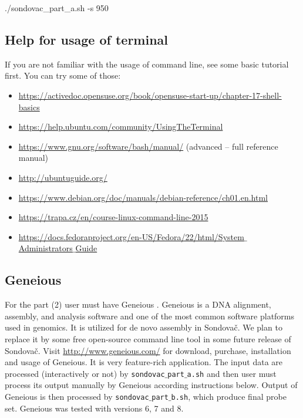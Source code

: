 \documentclass[a4paper, 11pt, twoside]{article}
\begin{document}
\begin{bashcode}
  ./sondovac_part_a.sh -s 950
\end{bashcode}

\subsection{Help for usage of terminal}

If you are not familiar with the usage of command line, see some basic tutorial first. You can try some of those:

\begin{itemize}
\item \href{https://activedoc.opensuse.org/book/opensuse-start-up/chapter-17-shell-basics}{https://activedoc.opensuse.org/book/opensuse-start-up/chapter-17-shell-basics}
\item \href{https://help.ubuntu.com/community/UsingTheTerminal}{https://help.ubuntu.com/community/UsingTheTerminal}
\item \href{https://www.gnu.org/software/bash/manual/}{https://www.gnu.org/software/bash/manual/} (advanced -- full reference manual)
\item \href{http://ubuntuguide.org/}{http://ubuntuguide.org/}
\item \href{https://www.debian.org/doc/manuals/debian-reference/ch01.en.html}{https://www.debian.org/doc/manuals/debian-reference/ch01.en.html}
\item \href{https://trapa.cz/en/course-linux-command-line-2015}{https://trapa.cz/en/course-linux-command-line-2015}
\item \href{https://docs.fedoraproject.org/en-US/Fedora/22/html/System_Administrators_Guide}{https://docs.fedoraproject.org/en-US/Fedora/22/html/System$\_$Administrators$\_$Guide}
\end{itemize}

\subsection{Geneious}
\label{geneious}

For the part (2) user must have Geneious \citep{Kearse2012}. Geneious is a DNA alignment, assembly, and analysis software and one of the most common software platforms used in genomics. It is utilized for de novo assembly in Sondovač. We plan to replace it by some free open-source command line tool in some future release of Sondovač. Visit \href{http://www.geneious.com/}{http://www.geneious.com/} for download, purchase, installation and usage of Geneious. It is very feature-rich application. The input data are processed (interactively or not) by \texttt{sondovac$\_$part$\_$a.sh} and then user must process its output manually by Geneious according instructions below. Output of Geneious is then processed by \texttt{sondovac$\_$part$\_$b.sh}, which produce final probe set. Geneious was tested with versions 6, 7 and 8.
\end{document}
